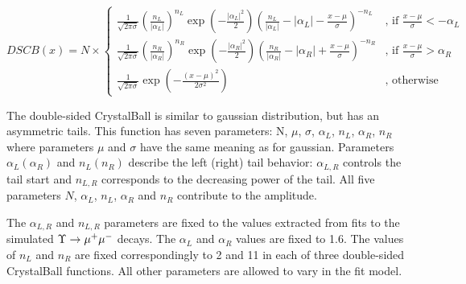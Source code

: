 \begin{equation}
DSCB(x) = N \times
\begin{cases}
\frac{1}{\sqrt{2\pi\sigma}}{(\frac{n_L}{|\alpha_L|})}^{n_L}\exp(-\frac{|\alpha_L|^2}{2}){(\frac{n_L}{|\alpha_L|}-|\alpha_L|-\frac{x-\mu}{\sigma})}^{-n_L} & \text{, if $\frac{x-\mu}{\sigma} < -\alpha_L$}\\
\frac{1}{\sqrt{2\pi\sigma}}{(\frac{n_R}{|\alpha_R|})}^{n_R}\exp(-\frac{|\alpha_R|^2}{2}){(\frac{n_R}{|\alpha_R|}-|\alpha_R|+\frac{x-\mu}{\sigma})}^{-n_R} & \text{, if $\frac{x-\mu}{\sigma} > \alpha_R$}\\
\frac{1}{\sqrt{2\pi\sigma}}\exp(-\frac{{(x-\mu)}^2}{2\sigma^2}) & \text{, otherwise}
\end{cases}
\label{eq:dcb}
\end{equation}

The double-sided CrystalBall is similar to gaussian
distribution, but has an asymmetric tails. This function has seven parameters:
N, $\mu$, $\sigma$, $\alpha_L$, $n_L$, $\alpha_R$, $n_R$ where parameters $\mu$
and $\sigma$ have the same meaning as for gaussian. Parameters $\alpha_L
(\alpha_R)$ and $n_L (n_R)$ describe the left (right) tail behavior:
$\alpha_{L,R}$ controls the tail start and $n_{L,R}$ corresponds to the
decreasing power of the tail. All five parameters $N$, $\alpha_L$, $n_L$,
$\alpha_R$ and $n_R$ contribute to the amplitude.



The  $\alpha_{L,R}$ and $n_{L,R}$ parameters are fixed to the values extracted
from fits to the simulated $\Upsilon \rightarrow {\ensuremath{\mu^+\mu^-}}$ decays. The $\alpha_L$ and
$\alpha_R$ values are fixed to 1.6. The values of $n_L$  and $n_R$ are fixed
correspondingly to 2 and 11 in each of three double-sided CrystalBall
functions. All other parameters are allowed to vary in the fit model.

